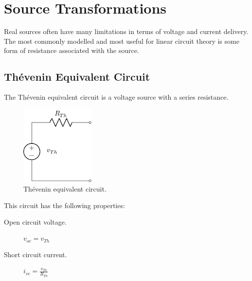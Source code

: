 \documentclass{article}
\begin{document}
\section{Source Transformations}
Real sources often have many limitations in terms of voltage and current delivery.
The most commonly modelled and most useful for linear circuit theory is some form of
resistance associated with the source.
\subsection{Thévenin Equivalent Circuit}
\begin{definition}
    The Thévenin equivalent circuit is a voltage source with a series resistance.
    \begin{figure}[H]
        \centering
        \includegraphics[height = 4cm, keepaspectratio = true]{figures/thevenin_equivalent.pdf}
        \caption{Thévenin equivalent circuit.}
    \end{figure}
    This circuit has the following properties:
    \begin{description}
        \item[Open circuit voltage.] \(v_{oc} = v_{Th}\)
        \item[Short circuit current.] \(i_{sc} = \frac{v_{Th}}{R_{Th}}\)
    \end{description}
\end{definition}
\end{document}
